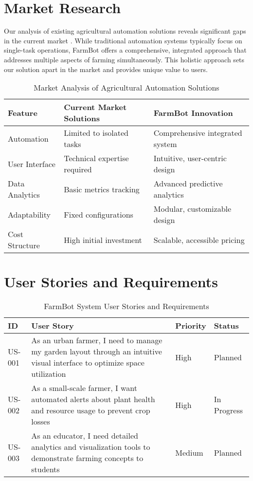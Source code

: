 \section{Market Research}
Our analysis of existing agricultural automation solutions reveals significant gaps in the current market \cite{iot_agriculture2023}. While traditional automation systems typically focus on single-task operations, FarmBot offers a comprehensive, integrated approach that addresses multiple aspects of farming simultaneously. This holistic approach sets our solution apart in the market and provides unique value to users.

\begin{table}[htbp]
\centering
\caption{Market Analysis of Agricultural Automation Solutions}
\begin{tabular}{|p{3cm}|p{5cm}|p{5cm}|}
\hline
\textbf{Feature} & \textbf{Current Market Solutions} & \textbf{FarmBot Innovation} \\
\hline
Automation & Limited to isolated tasks & Comprehensive integrated system \\
\hline
User Interface & Technical expertise required & Intuitive, user-centric design \\
\hline
Data Analytics & Basic metrics tracking & Advanced predictive analytics \\
\hline
Adaptability & Fixed configurations & Modular, customizable design \\
\hline
Cost Structure & High initial investment & Scalable, accessible pricing \\
\hline
\end{tabular}
\end{table}

\section{User Stories and Requirements}

\begin{longtable}{|p{}|p{}|p{}|p{}|}
\caption{FarmBot System User Stories and Requirements} \label{tab:user_stories} \\
\hline
\textbf{ID} & \textbf{User Story} & \textbf{Priority} & \textbf{Status} \\
\hline
\endfirsthead


\endhead


\endfoot


\hline
\endlastfoot
US-001 & As an urban farmer, I need to manage my garden layout through an intuitive visual interface to optimize space utilization & High & Planned \\
\hline
US-002 & As a small-scale farmer, I want automated alerts about plant health and resource usage to prevent crop losses & High & In Progress \\
\hline
US-003 & As an educator, I need detailed analytics and visualization tools to demonstrate farming concepts to students & Medium & Planned \\
\end{longtable}

